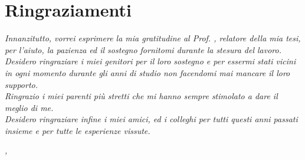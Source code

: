 
\cleardoublepage
{}
{}



\bigskip

\begingroup
\let\clearpage\relax
\let\cleardoublepage\relax
\let\cleardoublepage\relax

\chapter*{Ringraziamenti}

\noindent \textit{Innanzitutto, vorrei esprimere la mia gratitudine al Prof. \myProf, relatore della mia tesi, per l'aiuto, la pazienza ed il sostegno fornitomi durante la stesura del lavoro.}\\

\noindent \textit{Desidero ringraziare i miei genitori per il loro sostegno e per essermi stati vicini in ogni momento durante gli anni di studio non facendomi mai mancare il loro supporto.}\\

\noindent \textit{Ringrazio i miei parenti più stretti che mi hanno sempre stimolato a dare il meglio di me.}\\

\noindent \textit{Desidero ringraziare infine i miei amici, ed i colleghi per tutti questi anni passati insieme e per tutte le esperienze vissute.}\\
\bigskip

\noindent\textit{\myLocation, \myTime}
\hfill \myName

\endgroup

